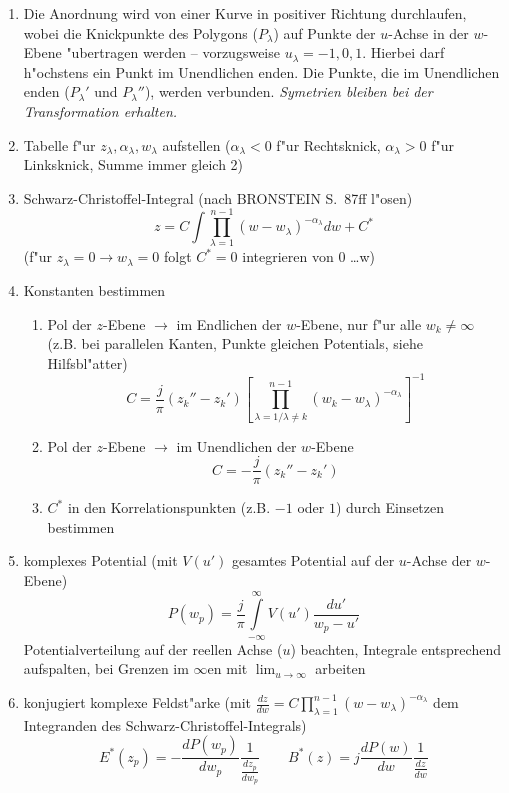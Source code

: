 \begin{enumerate}
\item Die Anordnung wird von einer Kurve in positiver Richtung durchlaufen,
      wobei die Knickpunkte des Polygons ($P_\lambda$) auf Punkte der $u$-Achse
      in der $w$-Ebene "ubertragen werden -- vorzugsweise $u_\lambda=-1,0,1$.
      Hierbei darf h"ochstens ein Punkt im Unendlichen enden. Die Punkte,
      die im Unendlichen enden ($P_\lambda'$ und $P_\lambda''$), werden
      verbunden. {\it Symetrien bleiben bei der Transformation erhalten.}
\item Tabelle f"ur $z_\lambda, \alpha_\lambda, w_\lambda$ aufstellen
      ($\alpha_\lambda<0$ f"ur Rechtsknick, $\alpha_\lambda>0$ f"ur Linksknick,
       Summe immer gleich 2)
\item Schwarz-Christoffel-Integral (nach BRONSTEIN S.~87ff l"osen)
     $$z=C\int\prod_{\lambda=1}^{n-1} (w-w_\lambda)^{-\alpha_\lambda}dw+C^\ast$$
     (f"ur $z_\lambda=0 \rightarrow w_\lambda=0$ folgt $C^\ast=0$ integrieren von
      0 \dots w)
\item Konstanten bestimmen
  \begin{enumerate}
  \item Pol der $z$-Ebene $\rightarrow$ im Endlichen der $w$-Ebene, nur f"ur alle
       $w_k\not=\infty$ (z.B. bei parallelen Kanten, Punkte gleichen Potentials,
       siehe Hilfsbl"atter)
        $$C=\frac{j}{\pi}(z_k''-z_k')\left[\prod_{\lambda=1/\lambda\not= k}^
        {n-1}(w_k-w_\lambda)^{-\alpha_\lambda}\right]^{-1}$$
  \item Pol der $z$-Ebene $\rightarrow$ im Unendlichen der $w$-Ebene
        $$C=-\frac{j}{\pi}(z_k''-z_k')$$
  \item $C^\ast$ in den Korrelationspunkten (z.B. $-1$ oder $1$) durch Einsetzen
        bestimmen
  \end{enumerate}
\item komplexes Potential (mit $V(u')$ gesamtes Potential auf der $u$-Achse der
     $w$-Ebene)
     $$P(w_p)=\frac{j}{\pi}\int\limits_{-\infty}^\infty V(u') \frac{du'}{w_p-u'}$$
     Potentialverteilung auf der reellen Achse ($u$) beachten, Integrale
     entsprechend aufspalten, bei Grenzen im $\infty$en mit
     $\lim_{u\rightarrow\infty}$ arbeiten
\item konjugiert komplexe Feldst"arke
    (mit $\frac{dz}{dw}=C\prod_{\lambda=1}^{n-1}(w-w_\lambda)^{-\alpha_\lambda}$
      dem Integranden des Schwarz-Christoffel-Integrals)
      $$E^\ast(z_p)=-\frac{dP(w_p)}{dw_p}\frac{1}{\frac{dz_p}{dw_p}} \qquad
      B^\ast(z)=j\frac{dP(w)}{dw} \frac{1}{\frac{dz}{dw}}$$
\end{enumerate}


